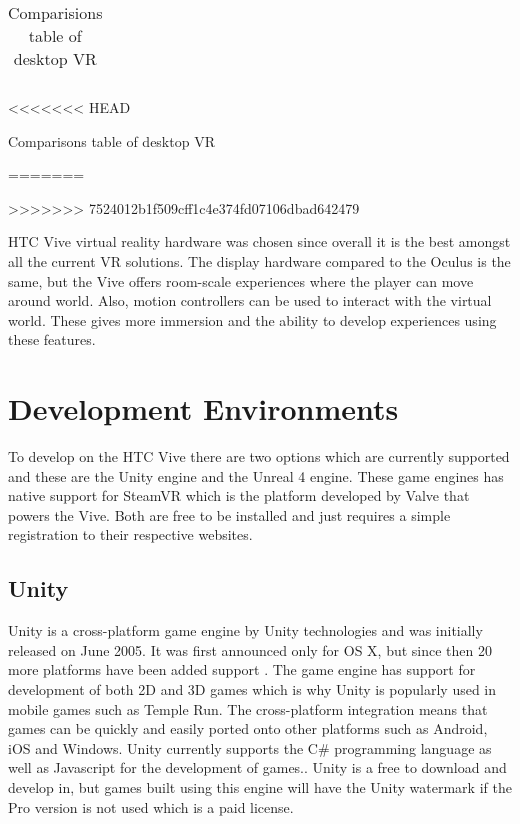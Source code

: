 \begin{table}[h]
\begin{tabular}{|l|l|l|}
\end{tabular}
<<<<<<< HEAD
\caption{Comparisons table of desktop VR \cite{oculusvive}}
=======
\caption{Comparisions table of desktop VR \cite{oculusvive}}
>>>>>>> 7524012b1f509cff1c4e374fd07106dbad642479
\label{desktoptable}
\end{table}

HTC Vive virtual reality hardware was chosen since overall it is the best amongst all the current VR solutions. The display hardware compared to the Oculus is the same, but the Vive offers room-scale experiences where the player can move around world. Also, motion controllers can be used to interact with the virtual world. These gives more immersion and the ability to develop experiences using these features.

\clearpage
\section{Development Environments}
To develop on the HTC Vive there are two options which are currently supported and these are the Unity engine and the Unreal 4 engine\cite{vivedev}. These game engines has native support for SteamVR which is the platform developed by Valve that powers the Vive. Both are free to be installed and just requires a simple registration to their respective websites.

\subsection{Unity}
Unity is a cross-platform game engine by Unity technologies and was initially released on June 2005\cite{unitywiki}. It was first announced only for OS X, but since then 20 more platforms have been added support \cite{unityhistory}. The game engine has support for development of both 2D and 3D games which is why Unity is popularly used in mobile games such as Temple Run. The cross-platform integration means that games can be quickly and easily ported onto other platforms such as Android, iOS and Windows. Unity currently supports the C\# programming language as well as Javascript for the development of games.\cite{unity3d}. Unity is a free to download and develop in, but games built using this engine will have the Unity watermark if the Pro version is not used which is a paid license.

